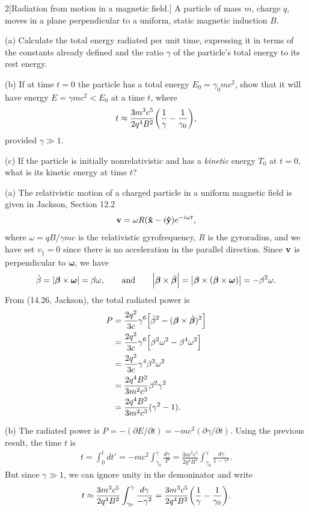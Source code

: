 \documentclass[12pt]{article}
\begin{document}
\begin{problem}{2}[Radiation from motion in a magnetic field.]
A particle of mass $m$, charge $q$, moves in a plane perpendicular to a uniform,
static magnetic induction $B$.

(a) Calculate the total energy radiated per unit time, expressing it in terms of
the constants already defined and the ratio $\gamma$ of the particle's total
energy to its rest energy.

(b) If at time $t=0$ the particle has a total energy $E_0=\gamma_0mc^2$, show
that it will have energy $E=\gamma mc^2<E_0$ at a time $t$, where
\begin{equation}
    t\approx\frac{3m^3c^5}{2q^4B^2}\qty(\frac1\gamma-\frac1{\gamma_0}), 
\end{equation}
provided $\gamma\gg 1$.

(c) If the particle is initially nonrelativistic and has a \textit{kinetic}
energy $T_0$ at $t=0$, what is its kinetic energy at time $t$?
\begin{solution}
(a) The relativistic motion of a charged particle in a uniform magnetic field is
given in Jackson, Section 12.2
\begin{equation}
    \vb{v}=\omega R(\vb{\hat{x}}-i\vb{\hat{y}})e^{-i\omega t},
\end{equation}
where $\omega=qB/\gamma mc$ is the relativistic gyrofrequency, $R$ is the
gyroradius, and we have set $v_\|=0$ since there is no acceleration in the
parallel direction. Since $\vb{v}$ is perpendicular to 
$\bm\omega$, we have
\begin{equation}
    \dot{\beta}=\abs{\bm\beta\times\bm\omega}=\beta\omega,\qquad\text{and}\qquad
    \abs{\bm\beta\times\dot{\bm\beta}}
    =\abs{\bm\beta\times(\bm\beta\times\bm\omega)}
    =-\beta^2\omega.
\end{equation}
From (14.26, Jackson), the total radiated power is
\begin{align}
    P
    &=\frac{2q^2}{3c}\gamma^6\qty[\dot\beta^2-(\bm\beta\times\dot{\bm\beta})^2]\notag\\
    &=\frac{2q^2}{3c}\gamma^6\qty[\beta^2\omega^2-\beta^4\omega^2]\notag\\
    &=\frac{2q^2}{3c}\gamma^4\beta^2\omega^2\notag\\
    &=\frac{2q^4B^2}{3m^2c^3}\beta^2\gamma^2\notag\\
    &=\frac{2q^4B^2}{3m^2c^3}(\gamma^2-1).
\end{align}

(b) The radiated power is $P=-(\partial E/\partial
t)=-mc^2(\partial\gamma/\partial t)$. Using the previous result, the time $t$ is
\begin{align}
    t=\int_0^tdt' 
    =-mc^2\int_{\gamma_0}^{\gamma}\frac{d\gamma}{P}
    =\frac{3m^3c^5}{2q^4B^2}\int_{\gamma_0}^\gamma\frac{d\gamma}{1-\gamma^2}.
\end{align}
But since $\gamma\gg 1$, we can ignore unity in the demoninator and write
\begin{equation}
    t\approx\frac{3m^3c^5}{2q^4B^2}\int_{\gamma_0}^\gamma\frac{d\gamma}{-\gamma^2}
    =\frac{3m^3c^5}{2q^4B^2}\qty(\frac1{\gamma}-\frac1{\gamma_0}).
\end{equation}


\end{solution}
\end{problem}
\end{document}
